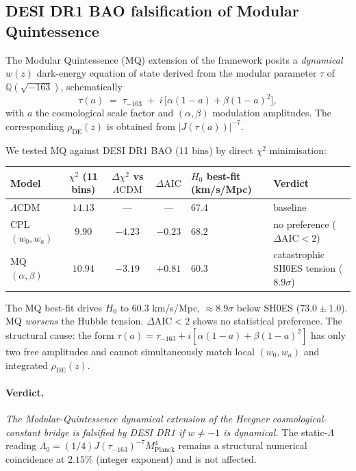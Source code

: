 \documentclass[11pt,a4paper]{article}
\newcommand{\QQ}{\mathbb{Q}}
\newcommand{\DE}{\mathrm{DE}}
\newcommand{\Planck}{\mathrm{Planck}}
\newcommand{\MP}{M_{\Planck}}
\newcommand{\MQ}{\mathrm{MQ}}
\newcommand{\CPL}{\mathrm{CPL}}
\newcommand{\LCDM}{\Lambda\mathrm{CDM}}
\newcommand{\AIC}{\mathrm{AIC}}
\begin{document}
\subsection{DESI DR1 BAO falsification of Modular Quintessence}\label{sec:desi}

The Modular Quintessence (MQ) extension of the framework posits a \emph{dynamical} $w(z)$ dark-energy equation of state derived from the modular parameter $\tau$ of $\QQ(\sqrt{-163})$, schematically
\[
\tau(a) \;=\; \tau_{-163} \;+\; i\,\bigl[\alpha (1 - a) + \beta (1 - a)^2\bigr],
\]
with $a$ the cosmological scale factor and $(\alpha, \beta)$ modulation amplitudes. The corresponding $\rho_{\DE}(z)$ is obtained from $|J(\tau(a))|^{-7}$.

We tested MQ against DESI DR1 BAO (11 bins) by direct $\chi^2$ minimisation:

\begin{center}
\begin{tabularx}{\textwidth}{lcccXl}
\toprule
Model & $\chi^2$ (11 bins) & $\Delta\chi^2$ vs $\LCDM$ & $\Delta\AIC$ & $H_0$ best-fit (km/s/Mpc) & Verdict \\
\midrule
$\LCDM$ & $14.13$ & --- & --- & $67.4$ & baseline \\
$\CPL$ $(w_0, w_a)$ & $9.90$  & $-4.23$ & $-0.23$ & $68.2$ & no preference ($\Delta\AIC < 2$) \\
$\MQ$ $(\alpha, \beta)$ & $10.94$ & $-3.19$ & $+0.81$ & $\mathbf{60.3}$ & catastrophic SH0ES tension ($8.9\sigma$) \\
\bottomrule
\end{tabularx}
\end{center}

The MQ best-fit drives $H_0$ to $60.3$ km/s/Mpc, $\approx 8.9\sigma$ below SH0ES ($73.0 \pm 1.0$). MQ \emph{worsens} the Hubble tension. $\Delta\AIC < 2$ shows no statistical preference. The structural cause: the form $\tau(a) = \tau_{-163} + i[\alpha(1-a) + \beta(1-a)^2]$ has only two free amplitudes and cannot simultaneously match local $(w_0, w_a)$ and integrated $\rho_{\DE}(z)$.

\paragraph{Verdict.} \emph{The Modular-Quintessence dynamical extension of the Heegner cosmological-constant bridge is falsified by DESI DR1 if $w \neq -1$ is dynamical.} The static-$\Lambda$ reading $\Lambda_0 = (1/4) J(\tau_{-163})^{-7} \MP^4$ remains a structural numerical coincidence at $2.15\%$ (integer exponent) and is not affected.
\end{document}
